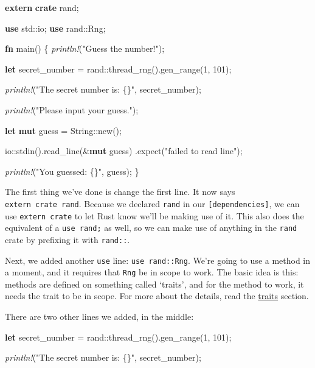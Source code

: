 \documentclass[a4paper,]{book}
\newenvironment{Shaded}{\begin{snugshade}}{\end{snugshade}}
\newcommand{\KeywordTok}[1]{\textcolor[rgb]{0.13,0.29,0.53}{\textbf{{#1}}}}
\newcommand{\DataTypeTok}[1]{\textcolor[rgb]{0.13,0.29,0.53}{{#1}}}
\newcommand{\DecValTok}[1]{\textcolor[rgb]{0.00,0.00,0.81}{{#1}}}
\newcommand{\StringTok}[1]{\textcolor[rgb]{0.31,0.60,0.02}{{#1}}}
\newcommand{\PreprocessorTok}[1]{\textcolor[rgb]{0.56,0.35,0.01}{\textit{{#1}}}}
\newcommand{\NormalTok}[1]{{#1}}
\begin{document}
\begin{Shaded}
\begin{Highlighting}[]
\KeywordTok{extern} \KeywordTok{crate} \NormalTok{rand;}

\KeywordTok{use} \NormalTok{std::io;}
\KeywordTok{use} \NormalTok{rand::Rng;}

\KeywordTok{fn} \NormalTok{main() \{}
    \PreprocessorTok{println!}\NormalTok{(}\StringTok{"Guess the number!"}\NormalTok{);}

    \KeywordTok{let} \NormalTok{secret_number = rand::thread_rng().gen_range(}\DecValTok{1}\NormalTok{, }\DecValTok{101}\NormalTok{);}

    \PreprocessorTok{println!}\NormalTok{(}\StringTok{"The secret number is: \{\}"}\NormalTok{, secret_number);}

    \PreprocessorTok{println!}\NormalTok{(}\StringTok{"Please input your guess."}\NormalTok{);}

    \KeywordTok{let} \KeywordTok{mut} \NormalTok{guess = }\DataTypeTok{String}\NormalTok{::new();}

    \NormalTok{io::stdin().read_line(&}\KeywordTok{mut} \NormalTok{guess)}
        \NormalTok{.expect(}\StringTok{"failed to read line"}\NormalTok{);}

    \PreprocessorTok{println!}\NormalTok{(}\StringTok{"You guessed: \{\}"}\NormalTok{, guess);}
\NormalTok{\}}
\end{Highlighting}
\end{Shaded}

The first thing we've done is change the first line. It now says
\texttt{extern\ crate\ rand}. Because we declared \texttt{rand} in our
\texttt{{[}dependencies{]}}, we can use \texttt{extern\ crate} to let
Rust know we'll be making use of it. This also does the equivalent of a
\texttt{use\ rand;} as well, so we can make use of anything in the
\texttt{rand} crate by prefixing it with \texttt{rand::}.

Next, we added another \texttt{use} line: \texttt{use\ rand::Rng}. We're
going to use a method in a moment, and it requires that \texttt{Rng} be
in scope to work. The basic idea is this: methods are defined on
something called `traits', and for the method to work, it needs the
trait to be in scope. For more about the details, read the
\protect\hyperlink{sec--traits}{traits} section.

There are two other lines we added, in the middle:

\begin{Shaded}
\begin{Highlighting}[]
    \KeywordTok{let} \NormalTok{secret_number = rand::thread_rng().gen_range(}\DecValTok{1}\NormalTok{, }\DecValTok{101}\NormalTok{);}

    \PreprocessorTok{println!}\NormalTok{(}\StringTok{"The secret number is: \{\}"}\NormalTok{, secret_number);}
\end{Highlighting}
\end{Shaded}
\end{document}
